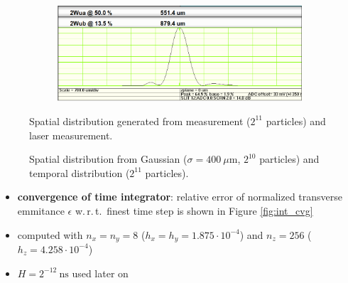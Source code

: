 \begin{center}
\begin{figure}[H]
   \begin{subfigure}{0.4\textwidth}
      
   \end{subfigure}
   \qquad \qquad \qquad
   \begin{subfigure}{0.5\textwidth}
      \includegraphics[width=\textwidth]{fig/laser}
   \end{subfigure}
   \caption{Spatial distribution generated from measurement ($2^{11}$ particles) and laser measurement.}
   \label{fig:gen_sp}
\end{figure}
\end{center}

\begin{center}
\begin{figure}[H]
   \begin{subfigure}{0.4\textwidth}
      
   \end{subfigure}
   \qquad \qquad \qquad
   \begin{subfigure}{0.4\textwidth}
      
   \end{subfigure}
   \caption{Spatial distribution from Gaussian ($\sigma=400\ \mu \mathrm{m}$, $2^{10}$ particles) and temporal distribution ($2^{11}$ particles).}
   \label{fig:gen_tmp}
\end{figure}
\end{center}

\newpage

\begin{itemize}
   \item \textbf{convergence of time integrator}: relative error of normalized transverse emmitance $\epsilon$ w.\,r.\,t.\ finest time step is shown in Figure \ref{fig:int_cvg}
   \item computed with $n_x=n_y=8$ ($h_x=h_y=1.875 \cdot 10^{-4}$) and $n_z=256$ ($h_z=4.258 \cdot 10^{-4}$)
   \item $H=2^{-12}\ \mathrm{ns}$ used later on
\end{itemize}

